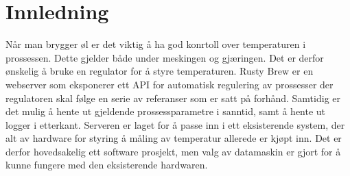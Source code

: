\section{Innledning}

Når man brygger øl er det viktig å ha god konrtoll over temperaturen i prossessen. Dette gjelder både under meskingen og gjæringen. Det er derfor ønskelig å bruke en regulator for å styre temperaturen. Rusty Brew er en webserver som eksponerer ett API for automatisk regulering av prossesser der regulatoren skal følge en serie av referanser som er satt på forhånd. Samtidig er det mulig å hente ut gjeldende prossessparametre i sanntid, samt å hente ut logger i etterkant. Serveren er laget for å passe inn i ett eksisterende system, der alt av hardware for styring å måling av temperatur allerede er kjøpt inn. Det er derfor hovedsakelig ett software prosjekt, men valg av datamaskin er gjort for å kunne fungere med den eksisterende hardwaren.